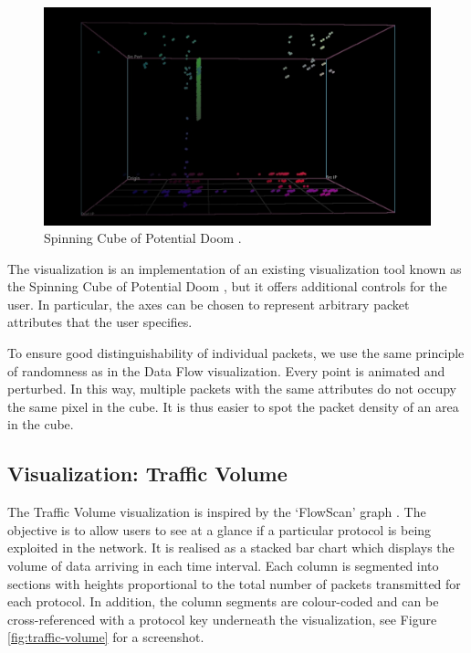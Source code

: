 \begin{figure}[htb]
   \centering
   \includegraphics[width=\linewidth]{materials/cube.jpg}
   \caption[Spinning Cube]{\label{fig:cube}
         Spinning Cube of Potential Doom \cite{lau2004spinning}.}
\end{figure}

The visualization is an implementation of an existing visualization tool known as the Spinning Cube
of Potential Doom \cite{lau2004spinning}, but it offers additional controls for the user. In
particular, the axes can be chosen to represent arbitrary packet attributes that the user specifies.

To ensure good distinguishability of individual packets, we use the same principle of randomness as
in the Data Flow visualization. Every point is animated and perturbed. In this way, multiple packets
with the same attributes do not occupy the same pixel in the cube. It is thus easier to spot the
packet density of an area in the cube.

\subsection{Visualization: Traffic Volume}
%
The Traffic Volume visualization is inspired by the `FlowScan' graph \cite{plonka2000flowscan}. The
objective is to allow users to see at a glance if a particular protocol is being exploited in the
network. It is realised as a stacked bar chart which displays the volume of data arriving in each
time interval. Each column is segmented into sections with heights proportional to the total number
of packets transmitted for each protocol. In addition, the column segments are colour-coded and can
be cross-referenced with a protocol key underneath the visualization, see Figure
\ref{fig:traffic-volume} for a screenshot.

